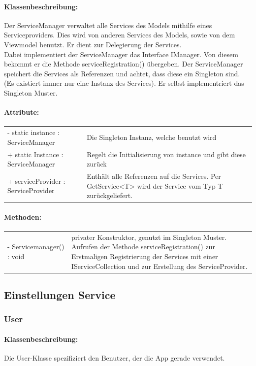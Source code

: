 \documentclass[a4paper,12pt]{article}
\begin{document}
	\paragraph{Klassenbeschreibung:}
	Der ServiceManager verwaltet alle Services des Models mithilfe eines Serviceproviders. Dies wird von anderen Services des Models, sowie von dem Viewmodel benutzt. Er dient zur Delegierung der Services.\\ 
	Dabei implementiert der ServiceManager das Interface IManager.
	Von diesem bekommt er die Methode serviceRegistration() übergeben.
	Der ServiceManager speichert die Services als Referenzen und achtet, dass diese ein Singleton sind. (Es existiert immer nur eine Instanz des Services).
	Er selbst implementriert das Singleton Muster.
	
	\paragraph{Attribute:}
	\begin{tabular}{p{7cm}p{10cm}}
		- static instance : ServiceManager & Die Singleton Instanz, welche benutzt wird \\
		+ static Instance : ServiceManager & Regelt die Initialisierung von instance und gibt diese zurück\\
		+ serviceProvider : ServiceProvider & Enthält alle Referenzen auf die Services. Per GetService<T> wird der Service vom Typ T zurückgeliefert.\\
	\end{tabular}
	\paragraph{Methoden:}
	\begin{tabular}{p{7cm}p{10cm}}
		- Servicemanager() : void & privater Konstruktor, genutzt im Singleton Muster. Aufrufen der Methode serviceRegistration() zur Erstmaligen Registrierung der Services mit einer IServiceCollection und zur Erstellung des ServiceProvider.\\
	\end{tabular}
		
\subsection{Einstellungen Service}
\subsubsection{User}
    \paragraph{Klassenbeschreibung:}
    Die User-Klasse spezifiziert den Benutzer, der die App gerade verwendet.\\
\end{document}
